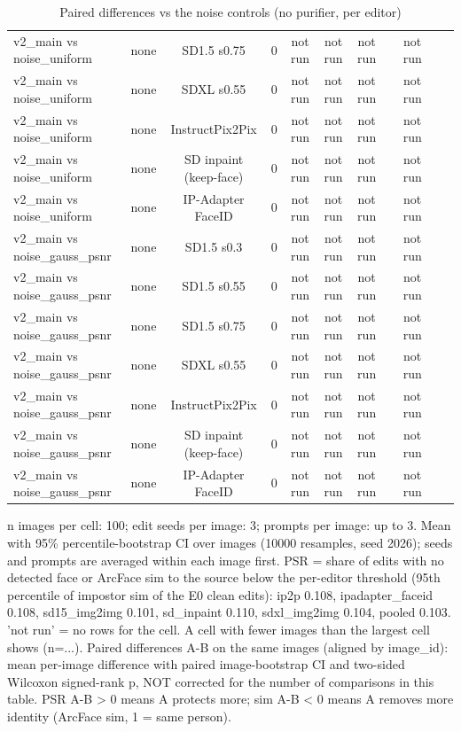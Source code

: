 \begin{table}[t]
{\begin{tabular}{lcccccccccc}
v2\_main vs noise\_uniform & none & SD1.5 s0.75 & 0 & not run & not run & not run &  & not run &  &  \\
v2\_main vs noise\_uniform & none & SDXL s0.55 & 0 & not run & not run & not run &  & not run &  &  \\
v2\_main vs noise\_uniform & none & InstructPix2Pix & 0 & not run & not run & not run &  & not run &  &  \\
v2\_main vs noise\_uniform & none & SD inpaint (keep-face) & 0 & not run & not run & not run &  & not run &  &  \\
v2\_main vs noise\_uniform & none & IP-Adapter FaceID & 0 & not run & not run & not run &  & not run &  &  \\
v2\_main vs noise\_gauss\_psnr & none & SD1.5 s0.3 & 0 & not run & not run & not run &  & not run &  &  \\
v2\_main vs noise\_gauss\_psnr & none & SD1.5 s0.55 & 0 & not run & not run & not run &  & not run &  &  \\
v2\_main vs noise\_gauss\_psnr & none & SD1.5 s0.75 & 0 & not run & not run & not run &  & not run &  &  \\
v2\_main vs noise\_gauss\_psnr & none & SDXL s0.55 & 0 & not run & not run & not run &  & not run &  &  \\
v2\_main vs noise\_gauss\_psnr & none & InstructPix2Pix & 0 & not run & not run & not run &  & not run &  &  \\
v2\_main vs noise\_gauss\_psnr & none & SD inpaint (keep-face) & 0 & not run & not run & not run &  & not run &  &  \\
v2\_main vs noise\_gauss\_psnr & none & IP-Adapter FaceID & 0 & not run & not run & not run &  & not run &  &  \\
\bottomrule
\end{tabular}
}
\caption{Paired differences vs the noise controls (no purifier, per editor)}
\label{tab:paired_vs_noise}
\par\footnotesize n images per cell: 100; edit seeds per image: 3; prompts per image: up to 3. Mean with 95\% percentile-bootstrap CI over images (10000 resamples, seed 2026); seeds and prompts are averaged within each image first. PSR = share of edits with no detected face or ArcFace sim to the source below the per-editor threshold (95th percentile of impostor sim of the E0 clean edits): ip2p 0.108, ipadapter\_faceid 0.108, sd15\_img2img 0.101, sd\_inpaint 0.110, sdxl\_img2img 0.104, pooled 0.103. 'not run' = no rows for the cell. A cell with fewer images than the largest cell shows (n=...). Paired differences A-B on the same images (aligned by image\_id): mean per-image difference with paired image-bootstrap CI and two-sided Wilcoxon signed-rank p, NOT corrected for the number of comparisons in this table. PSR A-B > 0 means A protects more; sim A-B < 0 means A removes more identity (ArcFace sim, 1 = same person).
\end{table}
